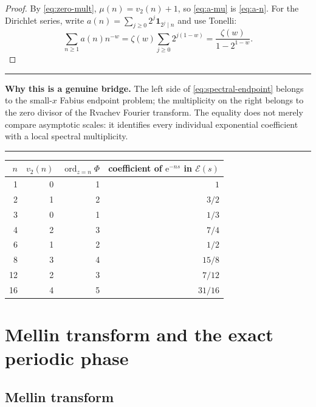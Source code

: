 \documentclass[11pt,oneside]{article}
\theoremstyle{definition}
\theoremstyle{remark}
\newcommand{\e}{\mathrm e}
\newcommand{\ord}{\operatorname{ord}}
\newcommand{\vtwo}{v_2}
\newenvironment{boxedremark}{%
  \par\smallskip\noindent\begin{center}\begin{minipage}{0.94\textwidth}%
  \color{black}\hrule\vspace{0.6em}\small
}{%
  \vspace{0.6em}\hrule\end{minipage}\end{center}\smallskip
}
\begin{document}
\begin{proof}
By \eqref{eq:zero-mult}, $\mu(n)=\vtwo(n)+1$, so \eqref{eq:a-mu} is
\eqref{eq:a-n}.  For the Dirichlet series, write
$a(n)=\sum_{j\ge0}2^j\mathbf1_{2^j\mid n}$ and use Tonelli:
\[
 \sum_{n\ge1}a(n)n^{-w}
 =\zeta(w)\sum_{j\ge0}2^{j(1-w)}
 =\frac{\zeta(w)}{1-2^{1-w}}.
\]
\end{proof}

\begin{boxedremark}
\textbf{Why this is a genuine bridge.}
The left side of \eqref{eq:spectral-endpoint} belongs to the small-$x$ Fabius endpoint
problem; the multiplicity on the right belongs to the zero divisor of the Rvachev Fourier
transform.  The equality does not merely compare asymptotic scales: it identifies every
individual exponential coefficient with a local spectral multiplicity.
\end{boxedremark}

\begin{center}
\begin{tabular}{@{}rrrr@{}}
\toprule
$n$ & $\vtwo(n)$ & $\ord_{z=n}\Phi$ & coefficient of $\e^{-ns}$ in $\mathcal E(s)$\\
\midrule
1 & 0 & 1 & $1$\\
2 & 1 & 2 & $3/2$\\
3 & 0 & 1 & $1/3$\\
4 & 2 & 3 & $7/4$\\
6 & 1 & 2 & $1/2$\\
8 & 3 & 4 & $15/8$\\
12 & 2 & 3 & $7/12$\\
16 & 4 & 5 & $31/16$\\
\bottomrule
\end{tabular}
\end{center}

\section{Mellin transform and the exact periodic phase}
\label{sec:Mellin}

\subsection{Mellin transform}
\end{document}
